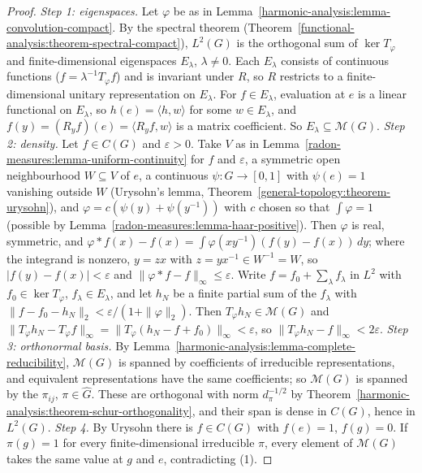 \begin{proof}
\emph{Step 1: eigenspaces.} Let $\varphi$ be as in Lemma~\ref{harmonic-analysis:lemma-convolution-compact}. By the spectral theorem (Theorem~\ref{functional-analysis:theorem-spectral-compact}), $L^2(G)$ is the orthogonal sum of
$\ker T_\varphi$ and finite-dimensional eigenspaces $E_\lambda$, $\lambda \neq 0$. Each $E_\lambda$ consists of continuous functions ($f = \lambda^{-1}T_\varphi f$) and is invariant under $R$, so $R$ restricts to a finite-dimensional
unitary representation on $E_\lambda$. For $f \in E_\lambda$, evaluation at $e$ is a linear functional on $E_\lambda$, so $h(e) = \langle h, w\rangle$ for some $w \in E_\lambda$, and $f(y) = (R_yf)(e) = \langle R_yf, w\rangle$ is a matrix
coefficient. So $E_\lambda \subseteq \mathcal{M}(G)$.
\emph{Step 2: density.} Let $f \in C(G)$ and $\varepsilon > 0$. Take $V$ as in Lemma~\ref{radon-measures:lemma-uniform-continuity} for $f$ and $\varepsilon$, a symmetric open neighbourhood $W \subseteq V$ of $e$, a continuous
$\psi \colon G \to [0, 1]$ with $\psi(e) = 1$ vanishing outside $W$ (Urysohn's lemma, Theorem~\ref{general-topology:theorem-urysohn}), and $\varphi = c(\psi(y) + \psi(y^{-1}))$ with $c$ chosen so that $\int\varphi = 1$ (possible by
Lemma~\ref{radon-measures:lemma-haar-positive}). Then $\varphi$ is real, symmetric, and $\varphi * f(x) - f(x) = \int\varphi(xy^{-1})(f(y) - f(x))\,dy$; where the integrand is nonzero, $y = zx$ with $z = yx^{-1} \in W^{-1} = W$, so
$|f(y) - f(x)| < \varepsilon$ and $\|\varphi * f - f\|_\infty \leq \varepsilon$. Write $f = f_0 + \sum_\lambda f_\lambda$ in $L^2$ with $f_0 \in \ker T_\varphi$, $f_\lambda \in E_\lambda$, and let $h_N$ be a finite partial sum of the
$f_\lambda$ with $\|f - f_0 - h_N\|_2 < \varepsilon/(1 + \|\varphi\|_2)$. Then $T_\varphi h_N \in \mathcal{M}(G)$ and $\|T_\varphi h_N - T_\varphi f\|_\infty = \|T_\varphi(h_N - f + f_0)\|_\infty < \varepsilon$, so
$\|T_\varphi h_N - f\|_\infty < 2\varepsilon$.
\emph{Step 3: orthonormal basis.} By Lemma~\ref{harmonic-analysis:lemma-complete-reducibility}, $\mathcal{M}(G)$ is spanned by coefficients of irreducible representations, and equivalent representations have the same coefficients;
so $\mathcal{M}(G)$ is spanned by the $\pi_{ij}$, $\pi \in \widehat G$. These are orthogonal with norm $d_\pi^{-1/2}$ by Theorem~\ref{harmonic-analysis:theorem-schur-orthogonality}, and their span is dense in $C(G)$, hence in
$L^2(G)$.
\emph{Step 4.} By Urysohn there is $f \in C(G)$ with $f(e) = 1$, $f(g) = 0$. If $\pi(g) = 1$ for every finite-dimensional irreducible $\pi$, every element of $\mathcal{M}(G)$ takes the same value at $g$ and $e$, contradicting (1).
\end{proof}

